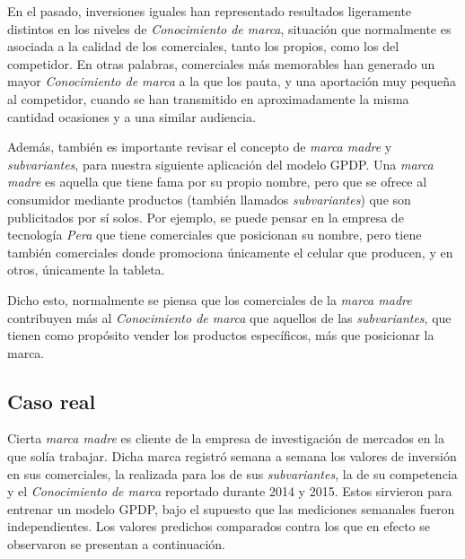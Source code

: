 En el pasado, inversiones iguales han representado resultados ligeramente distintos en los niveles de \textit{Conocimiento de marca}, situaci\'on que normalmente es asociada a la calidad de los comerciales, tanto los propios, como los del competidor. En otras palabras, comerciales m\'as memorables han generado un mayor \textit{Conocimiento de marca} a la que los pauta, y una aportaci\'on muy pequeña al competidor, cuando se han transmitido en aproximadamente la misma cantidad ocasiones y a una similar audiencia.

Adem\'as, tambi\'en es importante revisar el concepto de \textit{marca madre} y \textit{subvariantes}, para nuestra siguiente aplicaci\'on del modelo GPDP. Una \textit{marca madre} es aquella que tiene fama por su propio nombre, pero que se ofrece al consumidor mediante productos (tambi\'en llamados \textit{subvariantes}) que son publicitados por s\'i solos. Por ejemplo, se puede pensar en la empresa de tecnolog\'ia \textit{Pera} que tiene comerciales que posicionan su nombre, pero tiene tambi\'en comerciales donde promociona \'unicamente el celular que producen, y en otros, \'unicamente la tableta.

Dicho esto, normalmente se piensa que los comerciales de la \textit{marca madre} contribuyen m\'as al \textit{Conocimiento de marca} que aquellos de las \textit{subvariantes}, que tienen como prop\'osito vender los productos espec\'ificos, m\'as que posicionar la marca.

\subsection{Caso real}

Cierta \textit{marca madre} es cliente de la empresa de investigaci\'on de mercados en la que sol\'ia trabajar. Dicha marca registr\'o semana a semana los valores de inversi\'on en sus comerciales, la realizada para los de sus \textit{subvariantes}, la de su competencia y el \textit{Conocimiento de marca} reportado durante 2014 y 2015. Estos sirvieron para entrenar un modelo GPDP, bajo el supuesto que las mediciones semanales fueron independientes. Los valores predichos comparados contra los que en efecto se observaron se presentan a continuaci\'on.

